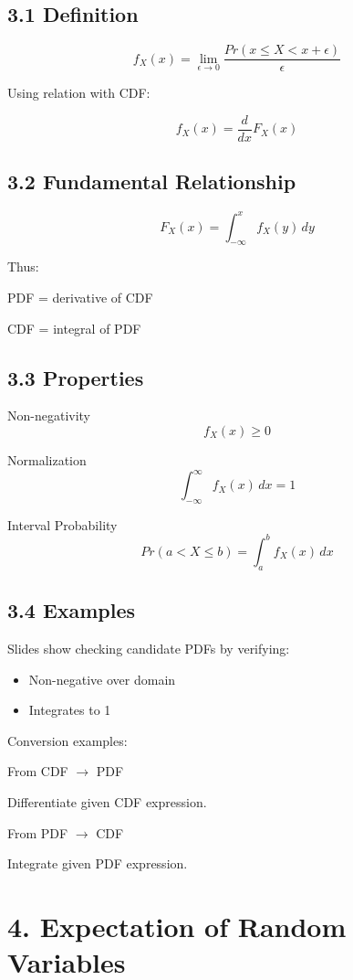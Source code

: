 \documentclass[11pt]{article}
\begin{document}
\subsection*{3.1 Definition}

\[
f_X(x)=\lim_{\epsilon\to 0}\frac{Pr(x\le X<x+\epsilon)}{\epsilon}
\]

Using relation with CDF:

\[
f_X(x)=\frac{d}{dx}F_X(x)
\]

\subsection*{3.2 Fundamental Relationship}

\[
F_X(x)=\int_{-\infty}^{x} f_X(y)\,dy
\]

Thus:

PDF = derivative of CDF

CDF = integral of PDF

\subsection*{3.3 Properties}

Non-negativity
\[
f_X(x)\ge 0
\]

Normalization
\[
\int_{-\infty}^{\infty} f_X(x)\,dx = 1
\]

Interval Probability
\[
Pr(a<X\le b)=\int_a^b f_X(x)\,dx
\]

\subsection*{3.4 Examples}

Slides show checking candidate PDFs by verifying:

\begin{itemize}
\item Non-negative over domain
\item Integrates to 1
\end{itemize}

Conversion examples:

From CDF $\rightarrow$ PDF

Differentiate given CDF expression.

From PDF $\rightarrow$ CDF

Integrate given PDF expression.

\section*{4. Expectation of Random Variables}
\end{document}
